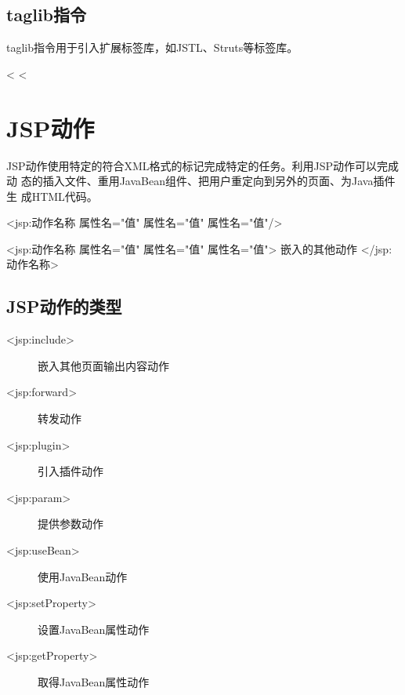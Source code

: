 \subsection{taglib指令} 

taglib指令用于引入扩展标签库，如JSTL、Struts等标签库。


\begin{jspCode}
  <%
  <%
\end{jspCode}

\section{JSP动作}

JSP动作使用特定的符合XML格式的标记完成特定的任务。利用JSP动作可以完成动
态的插入文件、重用JavaBean组件、把用户重定向到另外的页面、为Java插件生
成HTML代码。



\begin{jspCode}
  <jsp:动作名称 属性名="值" 属性名="值" 属性名="值"/>
\end{jspCode}


\begin{jspCode}
  <jsp:动作名称 属性名="值" 属性名="值" 属性名="值">
    嵌入的其他动作
  </jsp:动作名称>
\end{jspCode}

\subsection{JSP动作的类型} 

\begin{description}
\item[<jsp:include>] 嵌入其他页面输出内容动作
\item[<jsp:forward>] 转发动作
\item[<jsp:plugin>] 引入插件动作
\item[<jsp:param>] 提供参数动作
\item[<jsp:useBean>] 使用JavaBean动作
\item[<jsp:setProperty>] 设置JavaBean属性动作
\item[<jsp:getProperty>] 取得JavaBean属性动作
\end{description}


